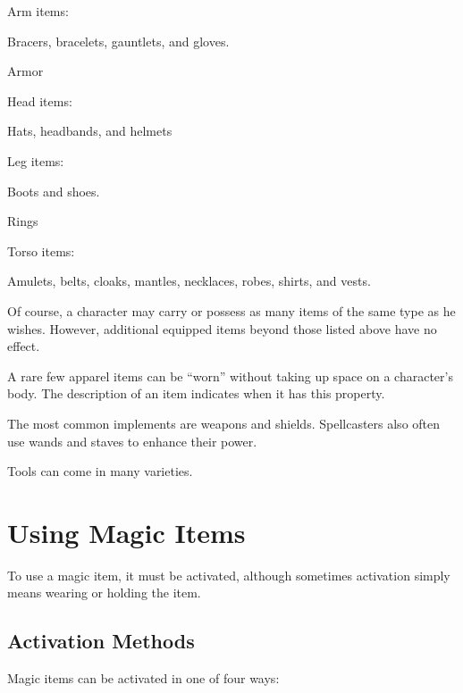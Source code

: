 \begin{itemize*}
  \item Arm items:
    \begin{itemize*}
      \item Bracers, bracelets, gauntlets, and gloves.
    \end{itemize*}
  \item Armor
  \item Head items:
    \begin{itemize*}
      \item Hats, headbands, and helmets
    \end{itemize*}
  \item Leg items:
    \begin{itemize*}
      \item Boots and shoes.
    \end{itemize*}
  \item Rings
  \item Torso items:
    \begin{itemize*}
      \item Amulets, belts, cloaks, mantles, necklaces, robes, shirts, and vests.
    \end{itemize*}
\end{itemize*}

Of course, a character may carry or possess as many items of the same type as he wishes. However, additional equipped items beyond those listed above have no effect.

A rare few apparel items can be ``worn'' without taking up space on a character's body. The description of an item indicates when it has this property.

 The most common implements are weapons and shields. Spellcasters also often use wands and staves to enhance their power.

 Tools can come in many varieties.

\section{Using Magic Items}

To use a magic item, it must be activated, although sometimes activation simply means wearing or holding the item.

\subsection{Activation Methods}
Magic items can be activated in one of four ways:

